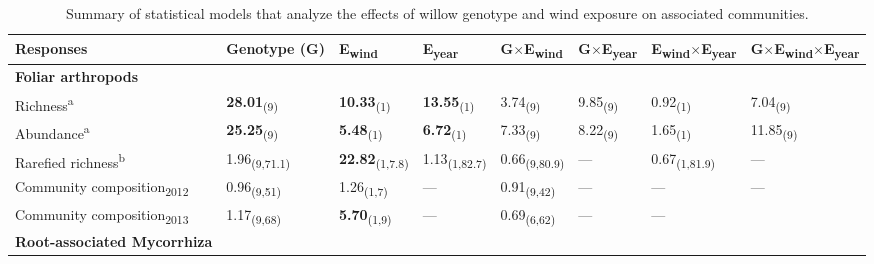 \documentclass[11pt]{article}
\newcommand{\rowgroup}[1]{\hspace{-1em}#1}
\begin{document}
\begin{table}
\centering
\caption{Summary of statistical models that analyze the
effects of willow genotype and wind exposure on associated communities.}
\label{wComm}
\begin{tabular}{@{}llllllll@{}}
\toprule
Responses  & Genotype (G)  & E\textsubscript{wind}  & E\textsubscript{year}   & G$\times$E\textsubscript{wind}       & G$\times$E\textsubscript{year}       & E\textsubscript{wind}$\times$E\textsubscript{year}    & G$\times$E\textsubscript{wind}$\times$E\textsubscript{year} \\
\midrule
\rowgroup{\textbf{Foliar arthropods}}  \\
Richness\textsuperscript{a}                  & \textbf{28.01}\textsubscript{(9)}      & \textbf{10.33}\textsubscript{(1)}     & \textbf{13.55}\textsubscript{(1)}        & 3.74\textsubscript{(9)}       & 9.85\textsubscript{(9)}       & 0.92\textsubscript{(1)}        & 7.04\textsubscript{(9)}       \\
Abundance\textsuperscript{a}                 & \textbf{25.25}\textsubscript{(9)}      & \textbf{5.48}\textsubscript{(1)}      & \textbf{6.72}\textsubscript{(1)}         & 7.33\textsubscript{(9)}       & 8.22\textsubscript{(9)}       & 1.65\textsubscript{(1)}        & 11.85\textsubscript{(9)}      \\
Rarefied richness\textsuperscript{b}         & 1.96\textsubscript{(9,71.1)}  & \textbf{22.82}\textsubscript{(1,7.8)} & 1.13\textsubscript{(1,82.7)}    & 0.66\textsubscript{(9,80.9)}  & ---             & 0.67\textsubscript{(1,81.9)}   & ---             \\
Community composition\textsubscript{2012}  & 0.96\textsubscript{(9,51)}    & 1.26\textsubscript{(1,7)}    &       ---          & 0.91\textsubscript{(9,42)}    &   ---            &       ---         &       ---        \\
Community composition\textsubscript{2013}  & 1.17\textsubscript{(9,68)}    & \textbf{5.70}\textsubscript{(1,9)}    &     ---            & 0.69\textsubscript{(6,62)}    &      ---         &       ---         &               \\
\textbf{Root-associated Mycorrhiza} &               &              &                 &               &               &                &               \\

\end{tabular}
\end{table}
\end{document}
